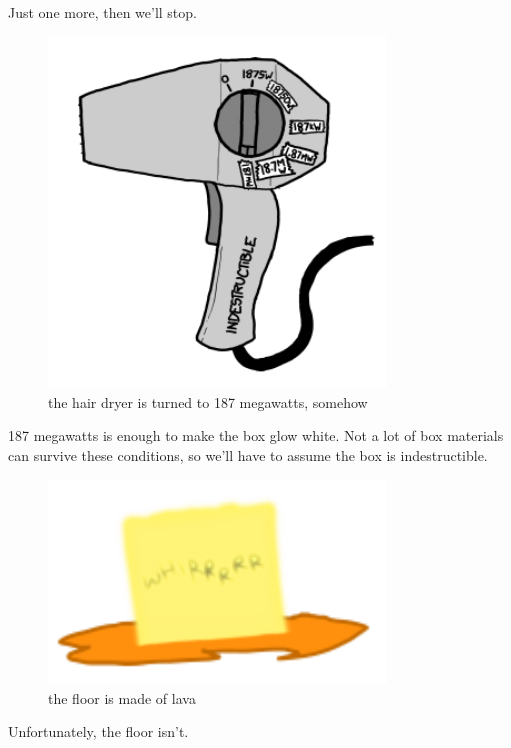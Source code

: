 {Just one more, then we'll stop.}

\begin{figure}[!htbp]
\centering
\includegraphics[scale=0.5, max width=0.8\textwidth]{imgs/a/35/hair_dryer_187500000.png}
\caption{the hair dryer is turned to 187 megawatts, somehow}
\end{figure}

{187 megawatts is enough to make the box glow white. Not a lot of box materials can survive these conditions, so we’ll have to assume the box is indestructible.}

\begin{figure}[!htbp]
\centering
\includegraphics[scale=0.5, max width=0.8\textwidth]{imgs/a/35/hair_dryer_box4500.png}
\caption{the floor is made of lava}
\end{figure}

{Unfortunately, the floor isn’t.}

